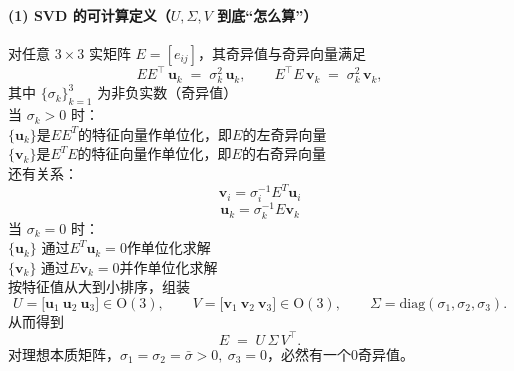 \documentclass[../main.tex]{subfiles}
\begin{document}
\begin{enumerate}
\begin{itemize}
\begin{enumerate}
\begin{itemize}
\begin{itemize}
\begin{small}
\begin{itemize}
\paragraph{(1) SVD 的可计算定义（$U,\Sigma,V$ 到底“怎么算”）}
对任意 $3{\times}3$ 实矩阵 $E=[e_{ij}]$，其奇异值与奇异向量满足
\[
EE^\top\,\mathbf{u}_k \;=\; \sigma_k^2\,\mathbf{u}_k,\qquad
E^\top E\,\mathbf{v}_k \;=\; \sigma_k^2\,\mathbf{v}_k,
\]
其中 $\{\sigma_k\}_{k=1}^3$ 为非负实数（奇异值）\\
当 $\sigma_k>0$ 时：
\\$\{\mathbf{u}_k\}$是$EE^T$的特征向量作单位化，即$E$的左奇异向量
\\$\{\mathbf{v}_k\}$是$E^TE$的特征向量作单位化，即$E$的右奇异向量
\\还有关系：
$$\mathbf{v}_i=\sigma_i^{-1}E^T\mathbf{u}_i$$
$$\mathbf{u}_k=\sigma_k^{-1}E\mathbf{v}_k$$
当 $\sigma_k=0$ 时：
\\$\{\mathbf{u}_k\}$ 通过$E^T\mathbf{u}_k=0$作单位化求解
\\$\{\mathbf{v}_k\}$ 通过$E\mathbf{v}_k=0$并作单位化求解\\
按特征值从大到小排序，组装
\[
U=\big[\mathbf{u}_1\ \mathbf{u}_2\ \mathbf{u}_3\big]\in\mathrm{O}(3),\qquad
V=\big[\mathbf{v}_1\ \mathbf{v}_2\ \mathbf{v}_3\big]\in\mathrm{O}(3),\qquad
\Sigma=\mathrm{diag}(\sigma_1,\sigma_2,\sigma_3).
\]
从而得到
\[
E \;=\; U\,\Sigma\,V^\top.
\]
对理想本质矩阵，$\sigma_1=\sigma_2=\bar{\sigma}>0,\ \sigma_3=0$，必然有一个0奇异值。


\end{itemize}
\end{small}
\end{itemize}
\end{itemize}
\end{enumerate}
\end{itemize}
\end{enumerate}
\end{document}
